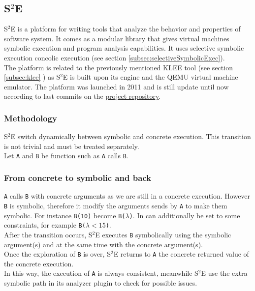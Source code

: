 \documentclass[11pt]{IEEEtran}
\begin{document}
      
	\subsection{S$^2$E}
    \label{subsec:S2E}
    	S$^2$E is a platform for writing tools that analyze the behavior and properties of software system. It comes as a modular library that gives virtual machines symbolic execution and program analysis capabilities.\cite{S2EWebSite} It uses selective symbolic execution concolic execution (see section  \ref{subsec:selectiveSymbolicExec}).\\
    	
		The platform is related to the previously mentioned KLEE tool (see section \ref{subsec:klee} ) as S$^2$E is built upon its engine and the QEMU virtual machine emulator.	
    	The platform was launched in 2011 and is still update until now according to last commits on the \href{https://github.com/S2E}{project repository}.

    	\subsubsection{Methodology}
    		S$^2$E switch dynamically between symbolic and concrete execution. This transition is not trivial and must be treated separately.\\
    		Let \texttt{A} and \texttt{B} be function such as \texttt{A} calls \texttt{B}.\\
    		\subsubsection*{From concrete to symbolic and back}
    			\texttt{A} calls \texttt{B} with concrete arguments as we are still in a concrete execution. However \texttt{B} is symbolic, therefore it modify the arguments sends by \texttt{A} to make them symbolic. For instance \texttt{B(10)} become \texttt{B($\lambda$)}. In can additionally be set to some constraints, for example \texttt{B($\lambda < 15$)}.\\
    			After the transition occurs, S$^2$E executes \texttt{B} symbolically using the symbolic argument(s) and at the same time with the concrete argument(s).\\
    			Once the exploration of \texttt{B} is over, S$^2$E returns to \texttt{A} the concrete returned value of the concrete execution.\\
    			In this way, the execution of \texttt{A} is always consistent, meanwhile S$^2$E use the extra symbolic path in its analyzer plugin to check for possible issues.
\end{document}
